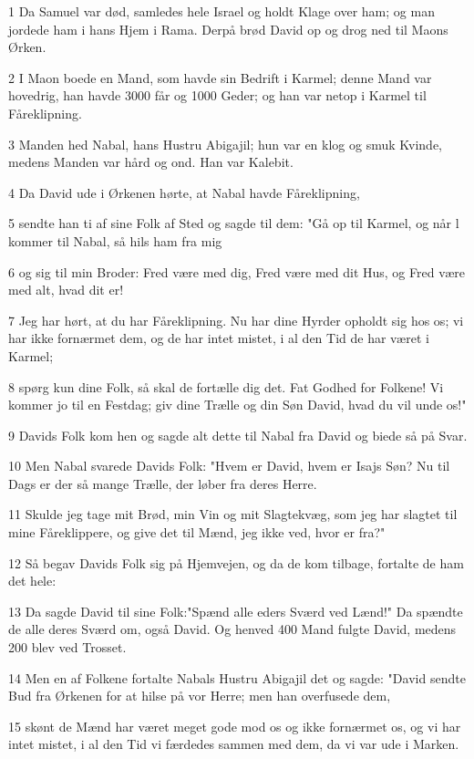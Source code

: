 \par 1 Da Samuel var død, samledes hele Israel og holdt Klage over ham; og man jordede ham i hans Hjem i Rama. Derpå brød David op og drog ned til Maons Ørken.
\par 2 I Maon boede en Mand, som havde sin Bedrift i Karmel; denne Mand var hovedrig, han havde 3000 får og 1000 Geder; og han var netop i Karmel til Fåreklipning.
\par 3 Manden hed Nabal, hans Hustru Abigajil; hun var en klog og smuk Kvinde, medens Manden var hård og ond. Han var Kalebit.
\par 4 Da David ude i Ørkenen hørte, at Nabal havde Fåreklipning,
\par 5 sendte han ti af sine Folk af Sted og sagde til dem: "Gå op til Karmel, og når l kommer til Nabal, så hils ham fra mig
\par 6 og sig til min Broder: Fred være med dig, Fred være med dit Hus, og Fred være med alt, hvad dit er!
\par 7 Jeg har hørt, at du har Fåreklipning. Nu har dine Hyrder opholdt sig hos os; vi har ikke fornærmet dem, og de har intet mistet, i al den Tid de har været i Karmel;
\par 8 spørg kun dine Folk, så skal de fortælle dig det. Fat Godhed for Folkene! Vi kommer jo til en Festdag; giv dine Trælle og din Søn David, hvad du vil unde os!"
\par 9 Davids Folk kom hen og sagde alt dette til Nabal fra David og biede så på Svar.
\par 10 Men Nabal svarede Davids Folk: "Hvem er David, hvem er Isajs Søn? Nu til Dags er der så mange Trælle, der løber fra deres Herre.
\par 11 Skulde jeg tage mit Brød, min Vin og mit Slagtekvæg, som jeg har slagtet til mine Fåreklippere, og give det til Mænd, jeg ikke ved, hvor er fra?"
\par 12 Så begav Davids Folk sig på Hjemvejen, og da de kom tilbage, fortalte de ham det hele:
\par 13 Da sagde David til sine Folk:"Spænd alle eders Sværd ved Lænd!" Da spændte de alle deres Sværd om, også David. Og henved 400 Mand fulgte David, medens 200 blev ved Trosset.
\par 14 Men en af Folkene fortalte Nabals Hustru Abigajil det og sagde: "David sendte Bud fra Ørkenen for at hilse på vor Herre; men han overfusede dem,
\par 15 skønt de Mænd har været meget gode mod os og ikke fornærmet os, og vi har intet mistet, i al den Tid vi færdedes sammen med dem, da vi var ude i Marken.
